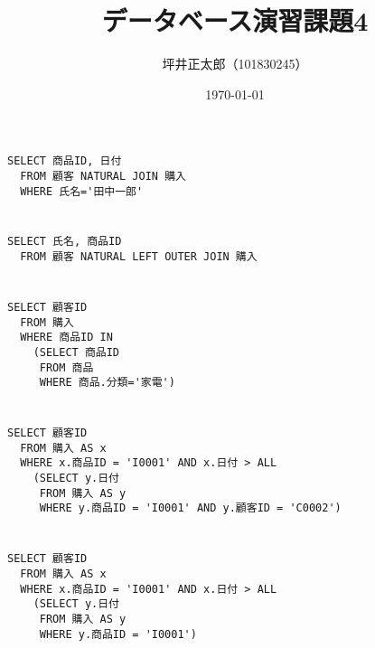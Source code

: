 \documentclass[a4paper,12pt]{jsarticle}
\begin{document}
\title{データベース演習課題4}
\author{坪井正太郎（101830245）}
\date{\today}
\maketitle
\section{}
\begin{lstlisting}[caption={}]
  SELECT 商品ID, 日付
  FROM 顧客 NATURAL JOIN 購入
  WHERE 氏名='田中一郎'
\end{lstlisting}

\section{}
\begin{lstlisting}[caption={},label={}]
  SELECT 氏名, 商品ID
  FROM 顧客 NATURAL LEFT OUTER JOIN 購入
\end{lstlisting}

\section{}
\begin{lstlisting}[caption={},label={}]
  SELECT 顧客ID
  FROM 購入
  WHERE 商品ID IN 
    (SELECT 商品ID
     FROM 商品
     WHERE 商品.分類='家電')
\end{lstlisting}
\newpage
\section{}
\begin{lstlisting}[caption={},label={}]
  SELECT 顧客ID
  FROM 購入 AS x
  WHERE x.商品ID = 'I0001' AND x.日付 > ALL
    (SELECT y.日付
     FROM 購入 AS y
     WHERE y.商品ID = 'I0001' AND y.顧客ID = 'C0002')
\end{lstlisting}

\section{}
\begin{lstlisting}[caption={},label={}]
  SELECT 顧客ID
  FROM 購入 AS x
  WHERE x.商品ID = 'I0001' AND x.日付 > ALL
    (SELECT y.日付
     FROM 購入 AS y
     WHERE y.商品ID = 'I0001')
\end{lstlisting}
\end{document}
